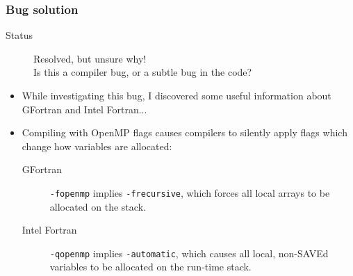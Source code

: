 \documentclass{beamer}
\begin{document}
\begin{frame}
  \frametitle{Bug solution}
  \begin{description}
    \item[Status] Resolved, but unsure why! \\
                  Is this a compiler bug, or a subtle bug in the code?
    
  \end{description}
  {\footnotesize
  \begin{itemize}
    \item While investigating this bug, I discovered some useful information about GFortran and Intel Fortran...
    \item Compiling with OpenMP flags causes compilers to silently apply flags which change how variables are allocated:
    \begin{description}
      \item[GFortran] \texttt{-fopenmp} implies \texttt{-frecursive}, which forces all local arrays to be allocated on the stack.
      \item[Intel Fortran] \texttt{-qopenmp} implies \texttt{-automatic}, which causes all local, non-SAVEd variables to be allocated on the run-time stack.
    \end{description}
  \end{itemize}
  }

\end{frame}
\end{document}
